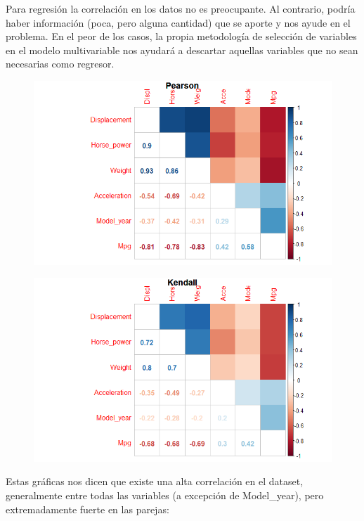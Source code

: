 \vspace{\baselineskip}

Para regresión la correlación en los datos no es preocupante. Al contrario, podría haber información (poca, pero alguna cantidad) que se aporte y nos ayude en el problema. En el peor de los casos, la propia metodología de selección de variables en el modelo multivariable nos ayudará a descartar aquellas variables que no sean necesarias como regresor.

\newpage

\begin{figure}[H]\includegraphics[width=\linewidth]{img/EDA_files/corr2.png} \end{figure}
\begin{figure}[H]\includegraphics[width=\linewidth]{img/EDA_files/corr1.png} \end{figure}

\newpage

Estas gráficas nos dicen que existe una alta correlación en el dataset, generalmente entre todas las variables (a excepción de Model\_year), pero extremadamente fuerte en las parejas:

